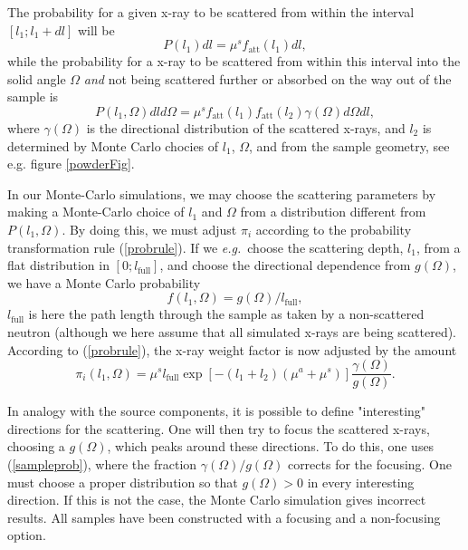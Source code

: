 The probability for a given x-ray to be scattered from within the interval
$[ l_1 ; l_1+dl ]$ will be
\begin{equation}
P(l_1) dl = \mu^s f_\mathrm{att}(l_1) dl ,
\end{equation}
while the probability for a x-ray to be scattered from within
this interval into the solid angle $\Omega$ {\em and}
not being scattered further
or absorbed on the way out of the sample is
\begin{equation}
P(l_1,\Omega) dl d\Omega =
  \mu^s f_\mathrm{att}(l_1) f_\mathrm{att}(l_2) \gamma(\Omega) d\Omega dl ,
\end{equation}
where $\gamma(\Omega)$ is the directional distribution
of the scattered x-rays, and $l_2$ is determined by
Monte Carlo chocies of $l_1$, $\Omega$,
and from the sample geometry, see e.g. figure \ref{powderFig}.

In our Monte-Carlo simulations, we may choose the scattering
parameters by making a Monte-Carlo choice of $l_1$ and $\Omega$
from a distribution different from $P(l_1,\Omega)$.
By doing this, we must adjust $\pi_i$ according to
the probability transformation rule (\ref{probrule}).
If we {\em e.g.}\ choose the scattering depth, $l_1$,
from a flat distribution in $[ 0 ; l_\mathrm{full} ]$,
and choose the directional dependence from $g(\Omega)$,
we have a Monte Carlo probability
\begin{equation}
f(l_1,\Omega) = g(\Omega) / l_\mathrm{full} ,
\end{equation}
$l_\mathrm{full}$ is here the path length through the sample
as taken by a non-scattered neutron (although we here
assume that all simulated x-rays are being scattered).
According to (\ref{probrule}), the x-ray weight factor
is now adjusted by the amount
\begin{equation}     \label{sampleprob}
\pi_i(l_1,\Omega) =
 \mu^s l_\mathrm{full} \exp \left[ - (l_1+l_2) (\mu^a + \mu^s) \right]
  \frac{\gamma(\Omega)}{g(\Omega)} .
\end{equation}

In analogy with the source components, it is possible to define
"interesting" directions for the scattering.
One will then try to focus the scattered x-rays,
choosing a $g(\Omega)$, which peaks around these directions.
To do this, one uses (\ref{sampleprob}), where the
fraction $\gamma(\Omega)/g(\Omega)$ corrects for the focusing.
One must choose a proper distribution so that
$g(\Omega) > 0$ in every interesting direction. If this is not the
case, the Monte Carlo simulation gives incorrect results.
All samples have been constructed with a focusing
and a non-focusing option.


